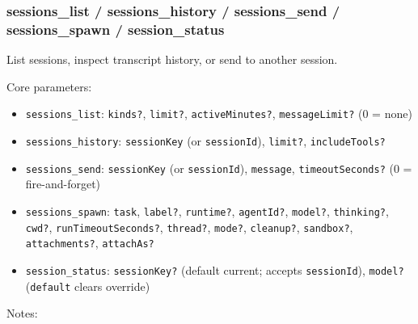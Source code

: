 \subsubsection{sessions\_list / sessions\_history / sessions\_send / sessions\_spawn / session\_status}


List sessions, inspect transcript history, or send to another session.

Core parameters:

\begin{itemize}
  \item \texttt{sessions\_list}: \texttt{kinds?}, \texttt{limit?}, \texttt{activeMinutes?}, \texttt{messageLimit?} (0 = none)
  \item \texttt{sessions\_history}: \texttt{sessionKey} (or \texttt{sessionId}), \texttt{limit?}, \texttt{includeTools?}
  \item \texttt{sessions\_send}: \texttt{sessionKey} (or \texttt{sessionId}), \texttt{message}, \texttt{timeoutSeconds?} (0 = fire-and-forget)
  \item \texttt{sessions\_spawn}: \texttt{task}, \texttt{label?}, \texttt{runtime?}, \texttt{agentId?}, \texttt{model?}, \texttt{thinking?}, \texttt{cwd?}, \texttt{runTimeoutSeconds?}, \texttt{thread?}, \texttt{mode?}, \texttt{cleanup?}, \texttt{sandbox?}, \texttt{attachments?}, \texttt{attachAs?}
  \item \texttt{session\_status}: \texttt{sessionKey?} (default current; accepts \texttt{sessionId}), \texttt{model?} (\texttt{default} clears override)
\end{itemize}


Notes:

